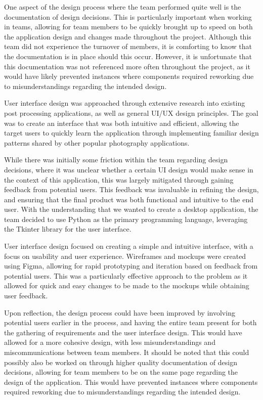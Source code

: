 \documentclass[conference]{IEEEtran}
\begin{document}
One aspect of the design process where the team performed quite well is the documentation of design decisions. This is particularly important when working in teams, allowing for team members to be quickly brought up to speed on both the application design and changes made throughout the project. Although this team did not experience the turnover of members, it is comforting to know that the documentation is in place should this occur. However, it is unfortunate that this documentation was not referenced more often throughout the project, as it would have likely prevented instances where components required reworking due to misunderstandings regarding the intended design. 

User interface design was approached through extensive research into existing post processing applications, as well as general UI/UX design principles. The goal was to create an interface that was both intuitive and efficient, allowing the target users to quickly learn the application through implementing familiar design patterns shared by other popular photography applications.

While there was initially some friction within the team regarding design decisions, where it was unclear whether a certain UI design would make sense in the context of this application, this was largely mitigated through gaining feedback from potential users. This feedback was invaluable in refining the design, and ensuring that the final product was both functional and intuitive to the end user.
With the understanding that we wanted to create a desktop application, the team decided to use Python as the primary programming language, leveraging the Tkinter library for the user interface.

User interface design focused on creating a simple and intuitive interface, with a focus on usability and user experience. Wireframes and mockups were created using Figma, allowing for rapid prototyping and iteration based on feedback from potential users. This was a particularly effective approach to the problem as it allowed for quick and easy changes to be made to the mockups while obtaining user feedback.

Upon reflection, the design process could have been improved by involving potential users earlier in the process, and having the entire team present for both the gathering of requirements and the user interface design. This would have allowed for a more cohesive design, with less misunderstandings and miscommunications between team members. It should be noted that this could possibly also be worked on through higher quality documentation of design decisions, allowing for team members to be on the same page regarding the design of the application. This would have prevented instances where components required reworking due to misunderstandings regarding the intended design. 
\end{document}
